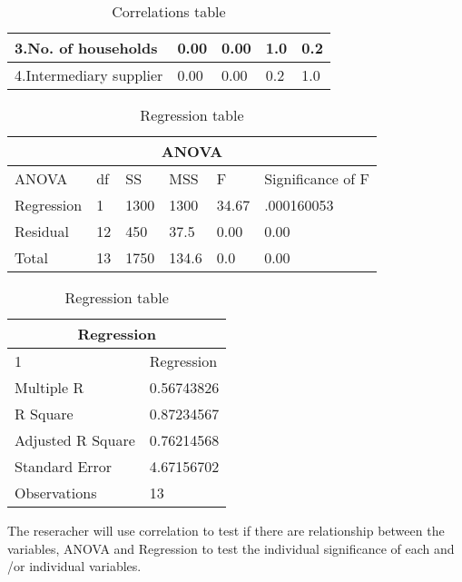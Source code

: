 \documentclass[11pt]{article}
\begin{document}
\begin{enumerate}
\begin{table}[htbp]
\begin{tabular}{|l|l|l|l|l|}
      3.No. of households&0.00&0.00&1.0&0.2 \\[4mm]\hline
      4.Intermediary supplier&0.00&0.00&0.2&1.0 \\[4mm]\hline
    \end{tabular}
    \caption{Correlations table}
    \label{table:correlation}
  \end{table}
  \begin{table}[t!]
    \centering
    \begin{tabular}{|l|l|l|l|l|l|}
      \hline
      \multicolumn{6}{|c|}{ANOVA} \\[2mm] \hline
      ANOVA&df&SS&MSS&F&Significance of F\\ [4mm] \hline
      Regression&1&1300&1300&34.67 & .000160053 \\[4mm] \hline
      Residual&12&450&37.5&0.00&0.00 \\[4mm]\hline
      Total&13&1750&134.6&0.0&0.00 \\[4mm]\hline
    \end{tabular}
    \caption{Anova table}
    \label{table:anova}
    \vspace{1cm}
    \begin{tabular}{|l|l|}
      \hline
      \multicolumn{2}{|c|}{Regression} \\[2mm] \hline
      1&Regression\\ [4mm] \hline
      Multiple R&0.56743826 \\[4mm] \hline
      R Square&0.87234567 \\[4mm]\hline
      Adjusted R Square&0.76214568 \\[4mm]\hline
      Standard Error&4.67156702 \\[4mm]\hline
      Observations&13 \\[4mm]\hline
    \end{tabular}
    \caption{Regression table}
    \label{table:regression}
  \end{table}
      \FloatBarrier
  The reseracher will use correlation to test if there are relationship between the variables, ANOVA and Regression to test the individual significance of each and /or individual variables.
\end{enumerate}
\end{document}

